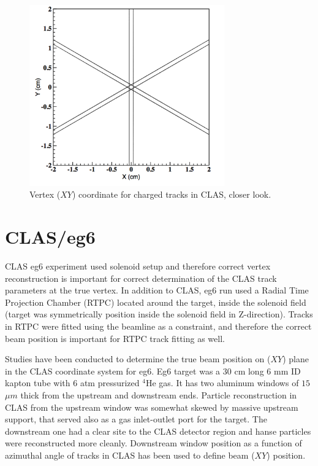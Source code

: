 \documentclass[12pt]{article}
\begin{document}
\begin{figure}[htb]
\begin{center}
\includegraphics[width=0.75\textwidth]{track_xy_close}
\caption{Vertex ($XY$) coordinate for charged tracks in CLAS, closer look.}
\label{fig:xytrackc}
\end{center}
\end{figure}

\section{CLAS/eg6}

CLAS eg6 experiment used solenoid setup and therefore correct vertex reconstruction is important for correct determination of the CLAS track parameters at the true vertex. In addition to CLAS, eg6 run used a Radial Time Projection Chamber (RTPC) located around the target, inside the solenoid field (target was symmetrically position inside the solenoid field in Z-direction). Tracks in RTPC were fitted using the beamline as a constraint, and therefore the correct beam position is important for RTPC track fitting as well. 

Studies have been conducted to determine the true beam position on ($XY$) plane in the CLAS coordinate system for eg6. Eg6 target was a $30$ cm long $6$ mm ID kapton tube with $6$ atm pressurized $^4$He gas. It has two aluminum windows of $15$ $\mu m$ thick from the upstream and downstream ends. Particle reconstruction in CLAS from the upstream window was somewhat skewed by massive upstream support, that served also as a gas inlet-outlet port for the target. The downstream one had a clear site to the CLAS detector region and hanse particles were reconstructed more cleanly. Downstream window position as a function of azimuthal angle of tracks in CLAS has been used to define beam ($XY$) position. 
\end{document}
